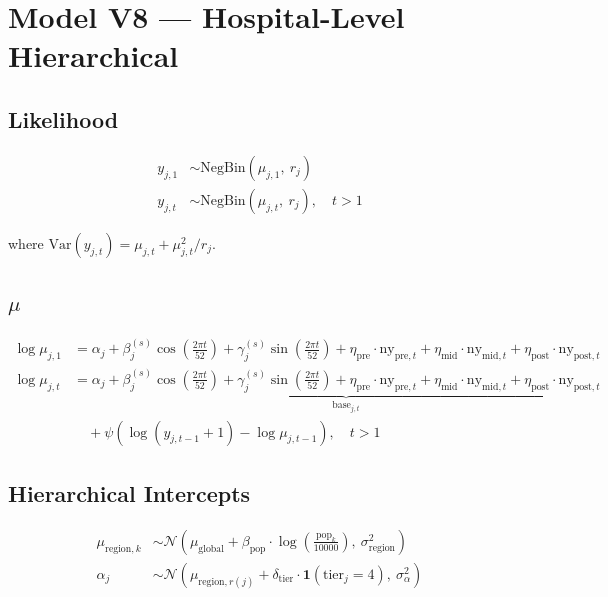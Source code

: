 \documentclass{article}
\begin{document}
\section*{Model V8 --- Hospital-Level Hierarchical}

\subsection*{Likelihood}

\begin{align}
  y_{j,1} &\sim \mathrm{NegBin}(\mu_{j,1},\ r_j) \\[6pt]
  y_{j,t} &\sim \mathrm{NegBin}(\mu_{j,t},\ r_j), \quad t > 1
\end{align}

where $\mathrm{Var}(y_{j,t}) = \mu_{j,t} + \mu_{j,t}^2 / r_j$.

\subsection*{$\mu$}

\begin{align}
  \log \mu_{j,1} &= \alpha_j
    + \beta_j^{(s)} \cos\!\left(\tfrac{2\pi t}{52}\right)
    + \gamma_j^{(s)} \sin\!\left(\tfrac{2\pi t}{52}\right)
    + \eta_{\text{pre}} \cdot \mathrm{ny}_{\text{pre},t}
    + \eta_{\text{mid}} \cdot \mathrm{ny}_{\text{mid},t}
    + \eta_{\text{post}} \cdot \mathrm{ny}_{\text{post},t} \\[6pt]
  \log \mu_{j,t} &= \underbrace{\alpha_j
    + \beta_j^{(s)} \cos\!\left(\tfrac{2\pi t}{52}\right)
    + \gamma_j^{(s)} \sin\!\left(\tfrac{2\pi t}{52}\right)
    + \eta_{\text{pre}} \cdot \mathrm{ny}_{\text{pre},t}
    + \eta_{\text{mid}} \cdot \mathrm{ny}_{\text{mid},t}
    + \eta_{\text{post}} \cdot \mathrm{ny}_{\text{post},t}}_{\text{base}_{j,t}} \nonumber \\
    &\quad + \psi \left(\log(y_{j,t-1} + 1) - \log \mu_{j,t-1}\right), \quad t > 1
\end{align}

\subsection*{Hierarchical Intercepts}

\begin{align}
  \mu_{\text{region},k} &\sim \mathcal{N}\!\left(\mu_{\text{global}} + \beta_{\text{pop}} \cdot \log\!\left(\tfrac{\mathrm{pop}_k}{10000}\right),\ \sigma_{\text{region}}^2\right) \\[4pt]
  \alpha_j &\sim \mathcal{N}\!\left(\mu_{\text{region},r(j)} + \delta_{\text{tier}} \cdot \mathbf{1}(\text{tier}_j = 4),\ \sigma_\alpha^2\right)
\end{align}
\end{document}
